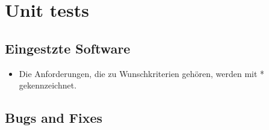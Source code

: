 \section{Unit tests}

\subsection{Eingestzte Software}
\begin{itemize}
  \item Die Anforderungen, die zu Wunschkriterien gehören, werden mit * gekennzeichnet.
\end{itemize}

\subsection{Bugs and Fixes}




